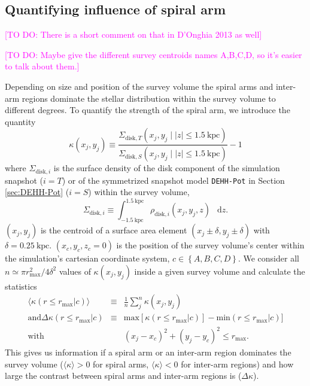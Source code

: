 \documentclass[iop,revtex4,numberedappendix,appendixfloats]{emulateapj}
\newcommand*\diff{\mathop{}\!\mathrm{d}}
\newcommand{\Wilma}[1]{\textcolor{Magenta}{#1}}
\begin{document}
\subsection{Quantifying influence of spiral arm}

\Wilma{[TO DO: There is a short comment on that in D'Onghia 2013 as well]}

\Wilma{[TO DO: Maybe give the different survey centroids names A,B,C,D, so it's easier to talk about them.]}

Depending on size and position of the survey volume the spiral arms and inter-arm regions dominate the stellar distribution within the survey volume to different degrees. To quantify the strength of the spiral arm, we introduce the quantity
\begin{equation*}
\kappa(x_j,y_j) \equiv \frac{\Sigma_{\text{disk},T}(x_j,y_j \mid |z|\leq 1.5~\text{kpc})}{\Sigma_{\text{disk},S}(x_j,y_j \mid |z| \leq1.5~\text{kpc})} -1
\end{equation*}
where $\Sigma_{\text{disk},i}$ is the surface density of the disk component  of the simulation snapshot ($i=T$) or of the symmetrized snapshot model \texttt{DEHH-Pot} in Section \ref{sec:DEHH-Pot} ($i=S$) within the survey volume,
\begin{equation}
\Sigma_{\text{disk},i} \equiv \int_{-1.5~\text{kpc}}^{1.5~\text{kpc}} \rho_{\text{disk},i}(x_j,y_j,z) \ \diff z.
\end{equation}
$(x_j,y_j)$ is the centroid of a surface area element $(x_j\pm\delta,y_j\pm \delta)$ with $\delta=0.25~\text{kpc}$. $(x_c,y_c,z_c=0)$ is the position of the survey volume's center within the simulation's cartesian coordinate system, $c\in\left\{ A,B,C,D\right\}$. We consider all $n \simeq \pi r_\text{max}^2/4\delta^2$ values of $\kappa(x_j,y_j)$ inside a given survey volume and calculate the statistics
\begin{eqnarray*}
\langle \kappa (r \leq r_\text{max} | c) \rangle &\equiv& \frac 1n \sum_j^n \kappa(x_j,y_j)\\
\text{and} \Delta \kappa(r \leq r_\text{max} | c) &\equiv& \text{max}[\kappa(r \leq r_\text{max} | c)] - \text{min}(r \leq r_\text{max} | c)]\\
\text{with} && (x_j-x_c)^2 + (y_j-y_c)^2 \leq r_\text{max}.
\end{eqnarray*}
This gives us information if a spiral arm or an inter-arm region dominates the survey volume ($\langle \kappa \rangle > 0$ for spiral arms, $\langle \kappa \rangle < 0$ for inter-arm regions) and how large the contrast between spiral arms and inter-arm regions is ($\Delta \kappa$).
\end{document}
